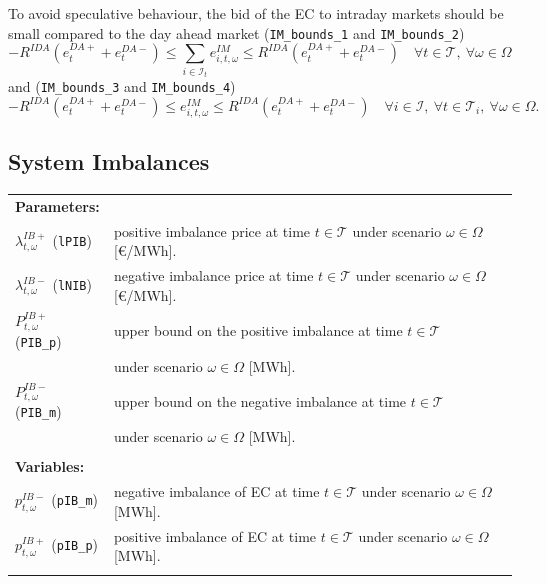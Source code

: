 \documentclass{article}
\begin{document}
To avoid speculative behaviour, the bid of the EC to intraday markets should be small compared to the day ahead market (\verb|IM_bounds_1| and \verb|IM_bounds_2|)
\begin{equation} \label{EQ:DM_IM_1}
	-R^{IDA} (e^{DA+}_{t} + e^{DA-}_{t})  \leq \sum_{i \in \mathcal{I}_t} e^{IM}_{i, t, \omega} \leq R^{IDA} (e^{DA+}_{t} + e^{DA-}_{t}) \quad \forall t \in \mathcal{T}, \ \forall \omega \in \Omega
\end{equation}
and (\verb|IM_bounds_3| and \verb|IM_bounds_4|)
\begin{equation} \label{EQ:IM_bounds_3-4}
	-R^{IDA} (e^{DA+}_{t} + e^{DA-}_{t}) \leq e^{IM}_{i, t, \omega} \leq R^{IDA} (e^{DA+}_{t} + e^{DA-}_{t}) \quad \forall i \in \mathcal{I}, \ \forall t \in \mathcal{T}_i, \ \forall \omega \in \Omega.
\end{equation}


\subsection{System Imbalances}

\begin{tabularx}{\textwidth}{l l}
    \textbf{Parameters:} \\
    $\lambda^{IB+}_{t, \omega}$ (\verb|lPIB|) & positive imbalance price at time $t \in \mathcal{T}$ under scenario $\omega \in \Omega$ [\euro/MWh]. \\
	$\lambda^{IB-}_{t, \omega}$ (\verb|lNIB|) & negative imbalance price at time $t \in \mathcal{T}$ under scenario $\omega \in \Omega$ [\euro/MWh]. \\
    $P^{IB+}_{t, \omega}$ (\verb|PIB_p|) & upper bound on the positive imbalance at time $t \in \mathcal{T}$ \\
    & under scenario $\omega \in \Omega$ [MWh]. \\
	$P^{IB-}_{t, \omega}$ (\verb|PIB_m|) & upper bound on the negative imbalance at time $t \in \mathcal{T}$ \\ 
	& under scenario $\omega \in \Omega$ [MWh]. \\
    \\ 
       
    \textbf{Variables:} \\
    $p_{t, \omega}^{IB-}$ (\verb|pIB_m|) & negative imbalance of EC at time $t \in \mathcal{T}$ under scenario $\omega \in \Omega$ [MWh].	\\
	$p_{t, \omega}^{IB+}$ (\verb|pIB_p|) & positive imbalance of EC at time $t \in \mathcal{T}$ under scenario $\omega \in \Omega$ [MWh].	\\ 
    \\
\end{tabularx}
\end{document}
